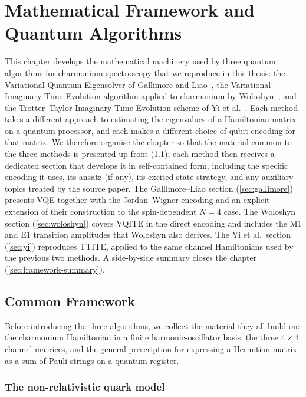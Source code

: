\chapter{Mathematical Framework and Quantum Algorithms}
\label{ch:framework}

This chapter develops the mathematical machinery used by three quantum
algorithms for charmonium spectroscopy that we reproduce in this thesis:
the Variational Quantum Eigensolver of Gallimore and
Liao~\cite{gallimore2023}, the Variational Imaginary-Time Evolution
algorithm applied to charmonium by Woloshyn~\cite{woloshyn2023}, and the
Trotter--Taylor Imaginary-Time Evolution scheme of Yi et
al.~\cite{yi2025}. Each method takes a different approach to estimating
the eigenvalues of a Hamiltonian matrix on a quantum processor, and each
makes a different choice of qubit encoding for that matrix. We therefore
organise the chapter so that the material common to the three methods is
presented up front (\cref{sec:common}); each method then receives a
dedicated section that develops it in self-contained form, including the
specific encoding it uses, its ansatz (if any), its excited-state
strategy, and any auxiliary topics treated by the source paper.
The Gallimore--Liao section (\cref{sec:gallimore}) presents VQE together
with the Jordan--Wigner encoding and an explicit extension of their
construction to the spin-dependent $N=4$ case. The Woloshyn section
(\cref{sec:woloshyn}) covers VQITE in the direct encoding and includes
the M1 and E1 transition amplitudes that Woloshyn also derives. The
Yi et al.\ section (\cref{sec:yi}) reproduces TTITE, applied to the same
channel Hamiltonians used by the previous two methods. A side-by-side
summary closes the chapter (\cref{sec:framework-summary}).


\section{Common Framework}
\label{sec:common}

Before introducing the three algorithms, we collect the material they all
build on: the charmonium Hamiltonian in a finite harmonic-oscillator
basis, the three $4\times 4$ channel matrices, and the general
prescription for expressing a Hermitian matrix as a sum of Pauli strings
on a quantum register.

\subsection{The non-relativistic quark model}
\label{ssec:quark_model}

